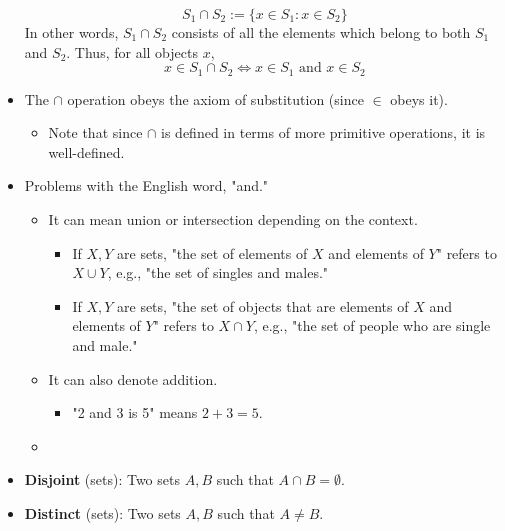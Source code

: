 \documentclass[../main.tex]{subfiles}
\begin{document}
\begin{itemize}
\begin{dfn}[Intersections]
        \begin{equation*}
            S_1\cap S_2 := \{x\in S_1:x\in S_2\}
        \end{equation*}
        In other words, $S_1\cap S_2$ consists of all the elements which belong to both $S_1$ and $S_2$. Thus, for all objects $x$,
        \begin{equation*}
            x\in S_1\cap S_2 \Longleftrightarrow x\in S_1\text{ and }x\in S_2
        \end{equation*}
    \end{dfn}
    \item The $\cap$ operation obeys the axiom of substitution (since $\in$ obeys it).
    \begin{itemize}
        \item Note that since $\cap$ is defined in terms of more primitive operations, it is well-defined.
    \end{itemize}
    \item Problems with the English word, "and."
    \begin{itemize}
        \item It can mean union or intersection depending on the context.
        \begin{itemize}
            \item If $X,Y$ are sets, "the set of elements of $X$ and elements of $Y$" refers to $X\cup Y$, e.g., "the set of singles and males."
            \item If $X,Y$ are sets, "the set of objects that are elements of $X$ and elements of $Y$" refers to $X\cap Y$, e.g., "the set of people who are single and male."
        \end{itemize}
        \item It can also denote addition.
        \begin{itemize}
            \item "2 and 3 is 5" means $2+3=5$.
        \end{itemize}
        \item {}
    \end{itemize}
    \item \textbf{Disjoint} (sets): Two sets $A,B$ such that $A\cap B=\emptyset$.
    \item \textbf{Distinct} (sets): Two sets $A,B$ such that $A\neq B$.

\end{itemize}
\end{document}

